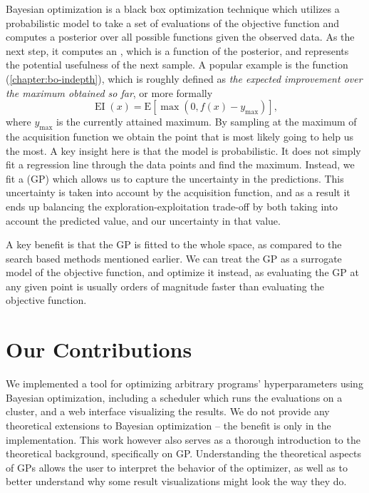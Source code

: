 Bayesian optimization \citep{nando-bayesian-out-of-the-loop} is a black box
optimization technique which utilizes a probabilistic model to take a set of
evaluations of the objective function and computes a posterior over all
possible functions given the observed data. As the next step, it computes an
, which is a function of the posterior, and
represents the potential usefulness of the next sample. A popular example is
the  function (\autoref{chapter:bo-indepth}), which is
roughly defined as \emph{the expected improvement over the maximum obtained so
far}, or more formally $$\operatorname{EI}(x) = \mathrm{E}\left[\max(0, f(x) - y_{\max})\right],$$ where $y_{\max}$ is the currently attained maximum. By sampling at the maximum of the acquisition function we obtain the
point that is most likely going to help us the most. A key insight here is that
the model is probabilistic. It does not simply fit a regression line through
the data points and find the maximum.  Instead, we fit a  (GP) which allows us to capture the uncertainty in the
predictions. This uncertainty is taken into account by the acquisition
function, and as a result it ends up balancing the exploration-exploitation
trade-off by both taking into account the predicted value, and our uncertainty
in that value.

A key benefit is that the GP is fitted to the whole space, as compared to the search based methods mentioned earlier. We can treat the GP as a surrogate model of the objective function, and optimize it instead, as evaluating the GP at any given point is usually orders of magnitude faster than evaluating the objective function.






\section{Our Contributions}

We implemented a tool for optimizing arbitrary programs' hyperparameters using
Bayesian optimization, including a scheduler which runs the evaluations on a
cluster, and a web interface visualizing the results. We do not provide any
theoretical extensions to Bayesian optimization -- the benefit is only in the
implementation. This work however also serves as a thorough introduction to the
theoretical background, specifically on GP. Understanding the theoretical
aspects of GPs allows the user to interpret the behavior of the optimizer, as
well as to better understand why some result visualizations might look the way
they do.

